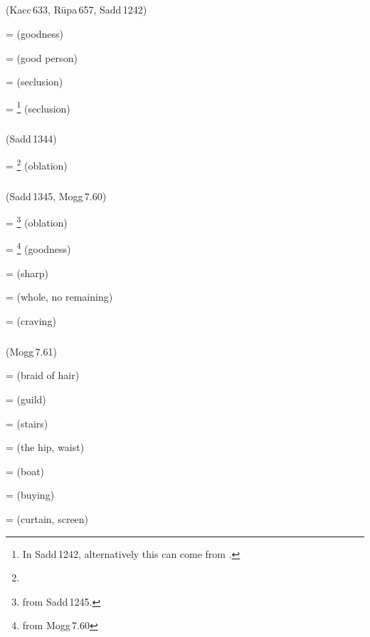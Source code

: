 \subparagraph*{} (Kacc\,633, R\=upa\,657, Sadd\,1242)\label{pacckx:yaadna}\label{pacckx:laadna}

 =  (goodness)\par
{} =  (good person)\par
{} =  (seclusion)\par
{} = \footnote{In Sadd\,1242, alternatively this can come from .} (seclusion)\par

\subparagraph*{} (Sadd\,1344)\label{pacckx:kkhidna}

 = \footnote{} (oblation)\par

\subparagraph*{} (Sadd\,1345, Mogg\,7.60)\label{pacckx:idna2}\label{pacckx:kidna}

 = \footnote{ from Sadd\,1245.} (oblation)\par
{} = \footnote{ from Mogg\,7.60} (goodness)\par
{} =  (sharp)\par
{} =  (whole, no remaining)\par
{} =  (craving)\par

\subparagraph*{} (Mogg\,7.61)\label{pacckx:dni}

 =  (braid of hair)\par
{} =  (guild)\par
{} =  (stairs)\par
{} =  (the hip, waist)\par
{} =  (boat)\par
{} =  (buying)\par
{} =  (curtain, screen)\par

